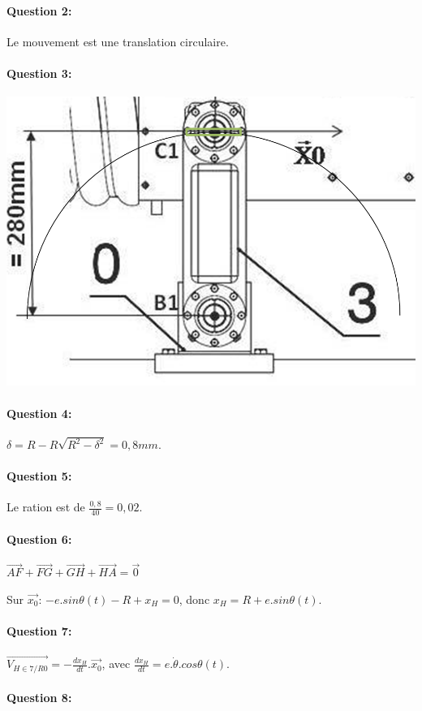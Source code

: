 \paragraph{Question 2:}

Le mouvement est une translation circulaire.

\paragraph{Question 3:}

\begin{center}
 \includegraphics[width=0.3\linewidth]{img/trajectoire}
\end{center}

\paragraph{Question 4:} $\delta=R-R\sqrt{R^2-\delta^2}=0,8mm$.

\paragraph{Question 5:} Le ration est de $\frac{0,8}{40}=0,02$.

\paragraph{Question 6:} $\overrightarrow{AF}+\overrightarrow{FG}+\overrightarrow{GH}+\overrightarrow{HA}=\overrightarrow{0}$

Sur $\overrightarrow{x_0}$: $-e.sin\theta(t)-R+x_H=0$, donc $x_H=R+e.sin\theta(t)$.

\paragraph{Question 7:} $\overrightarrow{V_{H\in7/R0}}=-\frac{dx_H}{dt}.\overrightarrow{x_0}$, avec $\frac{dx_H}{dt}=e.\dot{\theta}.cos\theta(t)$.

\paragraph{Question 8:} 


